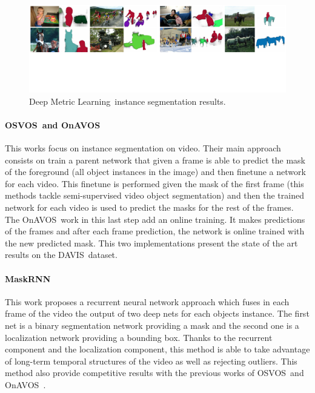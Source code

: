 \begin{figure}[h]
  \centering
  \includegraphics[width=1.\linewidth]{figures/deep_metric_learning/mask_classification.pdf}
  \caption{Deep Metric Learning~\deepml instance segmentation results. }
  \label{fig:deep_metric_learning}
\end{figure}

\paragraph{OSVOS~\osvos and OnAVOS~\onavos}
This works focus on instance segmentation on video.
Their main approach consists on train a parent network that given a frame is able to predict the mask of the foreground (all object instances in the image) and then finetune a network for each video.
This finetune is performed given the mask of the first frame (this methods tackle semi-supervised video object segmentation) and then the trained network for each video is used to predict the masks for the rest of the frames.
The OnAVOS~\onavos work in this last step add an online training.
It makes predictions of the frames and after each frame prediction, the network is online trained with the new predicted mask.
This two implementations present the state of the art results on the DAVIS~\davisboth dataset.

\paragraph{MaskRNN~\maskrnn}
This work proposes a recurrent neural network approach which fuses in each frame of the video the output of two deep nets for each objects instance.
The first net is a binary segmentation network providing a mask and the second one is a localization network providing a bounding box.
Thanks to the recurrent component and the localization component, this method is able to take advantage of long-term temporal structures of the video as well as rejecting outliers.
This method also provide competitive results with the previous works of OSVOS~\osvos and OnAVOS~\onavos.

